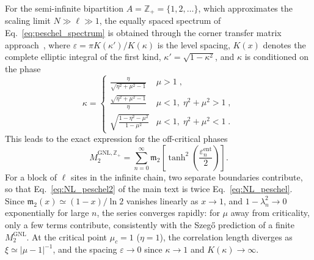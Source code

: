 \documentclass[aps,prl,twocolumn,superscriptaddress,reprint,longbibliography,nofootinbib]{revtex4-2}
\begin{document}
For the semi-infinite bipartition $A=\mathbb{Z}_+=\{1,2,\dots\}$, which approximates the scaling limit $N\gg\ell\gg1$, the equally spaced spectrum of Eq.~\eqref{eq:peschel_spectrum} is obtained through the corner transfer matrix approach~\cite{Peschel2009,Eisler2017}, where $\varepsilon = \pi K(\kappa')/K(\kappa)$ is the level spacing, $K(x)$ denotes the complete elliptic integral of the first kind, $\kappa' = \sqrt{1-\kappa^2}$, and $\kappa$ is conditioned on the phase~\cite{Peschel2009}
\begin{equation}
    \kappa = \begin{cases}
        \displaystyle\frac{\eta}{\sqrt{\eta^2 + \mu^2 - 1}} & \mu > 1 \;,\\[8pt]
        \displaystyle\frac{\sqrt{\eta^2 + \mu^2 - 1}}{\eta} & \mu < 1,\; \eta^2 + \mu^2 > 1\;,\\[8pt]
        \displaystyle\sqrt{\frac{1 - \eta^2 - \mu^2}{1 - \mu^2}} & \mu < 1,\; \eta^2 + \mu^2 < 1\;.
    \end{cases}
    \label{eq:elliptic_modulus}
\end{equation}
This leads to the exact expression for the off-critical phases
\begin{equation}
    M_2^{\mathrm{GNL},\mathbb{Z}_+} = \sum_{n=0}^{\infty} \mathfrak{m}_2\!\left[\tanh^2\left(\frac{\varepsilon_n^{\mathrm{ent}}}{2}\right)\right].
    \label{eq:NL_peschel}
\end{equation}
For a block of $\ell$ sites in the infinite chain, two separate boundaries contribute, so that Eq.~\eqref{eq:NL_peschel2} of the main text is twice Eq.~\eqref{eq:NL_peschel}. Since $\mathfrak{m}_2(x)\simeq(1-x)/\ln 2$ vanishes linearly as $x \to 1$, and $1-\lambda_n^2 \to 0$ exponentially for large $n$, the series converges rapidly: for $\mu$ away from criticality, only a few terms contribute, consistently with the Szeg\H{o} prediction of a finite $M_2^{\mathrm{GNL}}$. At the critical point $\mu_c=1$ ($\eta=1$), the correlation length diverges as $\xi\simeq |\mu-1|^{-1}$, and the spacing $\varepsilon \to 0$ since $\kappa \to 1$ and $K(\kappa) \to \infty$.
\end{document}
